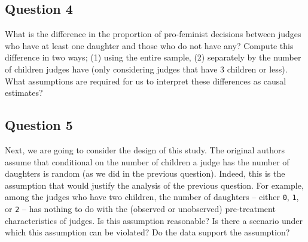 \documentclass[]{article}
\begin{document}
\subsection{Question 4}\label{question-4}

What is the difference in the proportion of pro-feminist decisions
between judges who have at least one daughter and those who do not have
any? Compute this difference in two ways; (1) using the entire sample,
(2) separately by the number of children judges have (only considering
judges that have 3 children or less). What assumptions are required for
us to interpret these differences as causal estimates?

\subsection{Question 5}\label{question-5}

Next, we are going to consider the design of this study. The original
authors assume that conditional on the number of children a judge has
the number of daughters is random (as we did in the previous question).
Indeed, this is the assumption that would justify the analysis of the
previous question. For example, among the judges who have two children,
the number of daughters -- either \texttt{0}, \texttt{1}, or \texttt{2}
-- has nothing to do with the (observed or unobserved) pre-treatment
characteristics of judges. Is this assumption reasonable? Is there a
scenario under which this assumption can be violated? Do the data
support the assumption?
\end{document}
